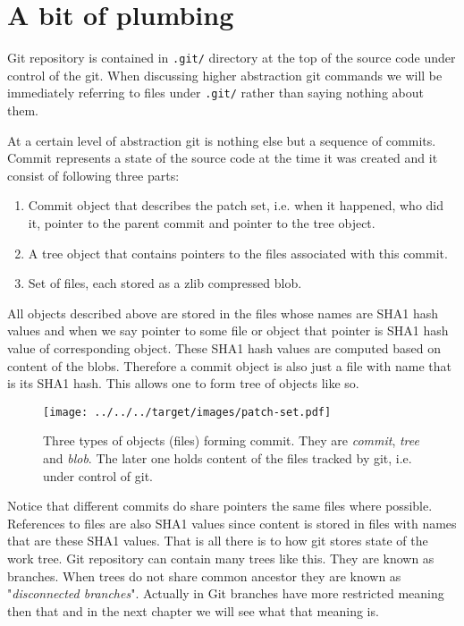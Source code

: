 \documentclass{article}
\theoremstyle{definition}
\begin{document}
        \section{A bit of plumbing}
        Git repository is contained in \texttt{.git/} directory at the top of the source code under control of the git. When
        discussing higher abstraction git commands we will be immediately referring to files under \texttt{.git/} rather
        than saying nothing about them.

        At a certain level of abstraction git is nothing else but a sequence of commits. Commit represents a state of the
        source code at the time it was created and it consist of following three parts:
        \begin{enumerate}
            \item Commit object that describes the patch set, i.e. when it happened, who did it, pointer to the parent commit and pointer to the tree object.
            \item A tree object that contains pointers to the files associated with this commit.
            \item Set of files, each stored as a zlib compressed blob.
        \end{enumerate}
        All objects described above are stored in the files whose names are SHA1 hash values and when we say pointer to some
        file or object that pointer is SHA1 hash value of corresponding object. These SHA1 hash values are computed based
        on content of the blobs. Therefore a commit object is also just a file with name that is its SHA1 hash. This allows one
        to form tree of objects like so.

        \begin{figure}[h]
        \centering
        \texttt{[image: ../../../target/images/patch-set.pdf]}
        \label{fig:patch-set}
        \caption{Three types of objects (files) forming commit. They are {\em commit}, {\em tree} and {\em blob}. The later
          one holds content of the files tracked by git, i.e. under control of git.}
        \end{figure}

        \noindent Notice that different commits do share pointers the same files where possible. References to files are
        also SHA1 values since content is stored in files with names that are these SHA1 values. That is all there is to how
        git stores state of the work tree. Git repository can contain many trees like this. They are known as branches. When
        trees do not share common ancestor they are known as "{\em disconnected branches}". Actually in Git branches have
        more restricted meaning then that and in the next chapter we will see what that meaning is.
\end{document}
